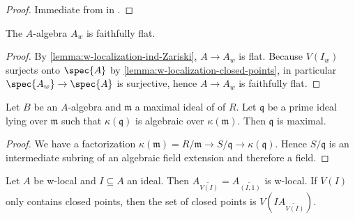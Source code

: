 \begin{proof}
  Immediate from  in .
\end{proof}

\begin{lemma}
    The $A$-algebra $A_w$ is faithfully flat.
    \label{lemma:w-localization-faithfully-flat}
    \leanok
\end{lemma}

\begin{proof}
    \leanok
    By \ref{lemma:w-localization-ind-Zariski}, $A \to A_w$ is flat. Because
    $V(I_w)$ surjects onto $\spec{A}$ by \ref{lemma:w-localization-closed-points},
    in particular $\spec{A_w} \to \spec{A}$ is surjective, hence
    $A \to A_w$ is faithfully flat.
\end{proof}

\begin{lemma}[\stacksproject{00GA}]
    Let $B$ be an $A$-algebra and $\mathfrak{m}$ a maximal ideal of of $R$. Let
    $\mathfrak{q}$ be a prime ideal lying over $\mathfrak{m}$ such that
    $\kappa(\mathfrak{q})$ is algebraic over $\kappa(\mathfrak{m})$. Then
    $\mathfrak{q}$ is maximal.
    \label{lemma:prime-over-maximal-algebraic}
    \leanok
\end{lemma}

\begin{proof}
    \leanok
    We have a factorization $\kappa(\mathfrak{m}) = R / \mathfrak{m} \to S / \mathfrak{q} \to \kappa(\mathfrak{q})$.
    Hence $S / \mathfrak{q}$ is an intermediate subring of an algebraic field extension and therefore
    a field.
\end{proof}

\begin{lemma}
    Let $A$ be w-local and $I \subseteq A$ an ideal. Then
    $A_{\widetilde{V(I)}} = A_{\widetilde{(I,1)}}$ is w-local. If $V(I)$ only contains closed points, then
    the set of closed points is $V(IA_{\widetilde{V(I)}})$.
    \label{lemma:w-local-tilde-w-local}
    \leanok
\end{lemma}

